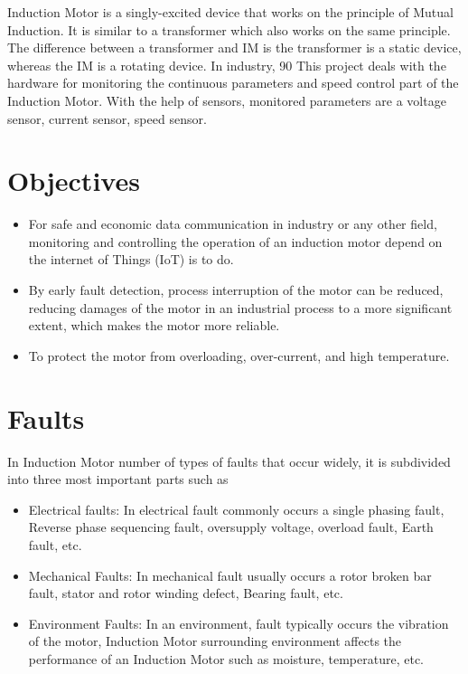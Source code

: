 Induction Motor is a singly-excited device that works on the principle of Mutual Induction. It is similar to a transformer which also works on the same principle. The difference between a transformer and IM is the transformer is a static device, whereas the IM is a rotating device. In industry, 90%
This project deals with the hardware for monitoring the continuous parameters and speed control part of the Induction Motor. With the help of sensors, monitored parameters are a voltage sensor, current sensor, speed sensor.

\section{Objectives}
\begin{itemize}
    \item {For safe and economic data communication in industry or any other field, monitoring and controlling the operation of an induction motor depend on the internet of Things (IoT) is to do.}
    \item {By early fault detection, process interruption of the motor can be reduced, reducing damages of the motor in an industrial process to a more significant extent, which makes the motor more reliable.}
    \item {To protect the motor from overloading, over-current, and high temperature.}
\end{itemize}

\section{Faults}
In Induction Motor number of types of faults that occur widely, it is subdivided into three most important parts such as 
\begin{itemize}
    \item {Electrical faults: In electrical fault commonly occurs a single phasing fault, Reverse phase sequencing fault, oversupply voltage, overload fault, Earth fault, etc.}
    \item {Mechanical Faults: In mechanical fault usually occurs a rotor broken bar fault, stator and rotor winding defect, Bearing fault, etc.}
    \item {Environment Faults: In an environment, fault typically occurs the vibration of the motor, Induction Motor surrounding environment affects the performance of an Induction Motor such as moisture, temperature, etc.}
\end{itemize}

